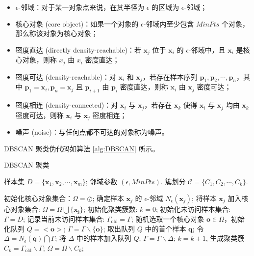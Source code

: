 \documentclass[12pt,AutoFakeBold]{article}
\begin{document}
\begin{itemize}
\item $\epsilon$-邻域：对于某一对象点来说，在其半径为 $\epsilon$ 的区域为 $\epsilon$-邻域；
\item 核心对象 (core object)：如果一个对象的 $\epsilon$-邻域内至少包含 $MinPts$ 个对象，那么称该对象为核心对象；
\item 密度直达 (directly density-reachable)：若 $\bm{x}_j$ 位于 $\bm{x}_i$ 的 $\epsilon$-邻域中，且 $\bm{x}_i$ 是核心对象，则称 $x_j$ 由 $x_i$ 密度直达；
\item 密度可达 (density-reachable)：对 $\bm{x}_i$ 和 $\bm{x}_j$，若存在样本序列 $\bm{p}_1,\bm{p}_2,\cdots,\bm{p}_n$，其中 $\bm{p}_1=\bm{x}_i,\bm{p}_n=\bm{x}_j$ 且 $\bm{p}_{i+1}$ 由 $\bm{p}_i$ 密度直达，则称 $\bm{x}_i$ 由 $\bm{x}_j$ 密度可达；
\item 密度相连 (density-connected)：对 $\bm{x}_i$ 与 $\bm{x}_j$，若存在 $\bm{x}_k$ 使得 $\bm{x}_i$ 与 $\bm{x}_j$ 均由 $\bm{x}_k$ 密度可达，则称 $\bm{x}_i$ 与 $\bm{x}_j$ 密度相连；
\item 噪声 (noise)：与任何点都不可达的对象称为噪声。
\end{itemize}

DBSCAN 聚类伪代码如算法 \ref{alg:DBSCAN} 所示。

\begin{algorithm}[H]
	\caption{DBSCAN 聚类}
	\label{alg:DBSCAN}
	\begin{algorithmic}[1]
	\Require 样本集 $D=\{\bm{x}_1,\bm{x}_2,\cdots,\bm{x}_m\}$; 邻域参数 $(\epsilon, MinPts)$.
	\Ensure 簇划分 $\mathcal{C} = \{C_1,C_2,\cdots,C_k\}$.
	
	\State 初始化核心对象集合：$\Omega=\oslash$;
		\State 确定样本 $\bm{x}_j$ 的 $\epsilon$-邻域 $N_\epsilon(\bm{x}_j)$;
			\State 将样本 $\bm{x}_j$ 加入核心对象集合: $\Omega=\Omega\bigcup\{\bm{x_j}\}$;
		\EndIf
	\EndFor
	\State 初始化聚类簇数: $k=0$;
	\State 初始化未访问样本集合: $\Gamma=D$;
	\While {$\Omega\neq\oslash$}
		\State 记录当前未访问样本集合: $\Gamma_{\mathrm{old}}=\Gamma$;
		\State 随机选取一个核心对象 $\bm{o}\in\Omega$，初始化队列 $Q=<\bm{o}>$;
		\State $\Gamma=\Gamma\backslash\{\bm{o}\}$;
			\State 取出队列 $Q$ 中的首个样本 $\bm{q}$;
				\State 令 $\Delta=N_\epsilon(\bm{q})\bigcap\Gamma$;
				\State 将 $\Delta$ 中的样本加入队列 $Q$;
				\State $\Gamma=\Gamma\backslash\Delta$;
			\EndIf
		\EndWhile
		\State $k=k+1$, 生成聚类簇 $C_k=\Gamma_{\mathrm{old}}\backslash\Gamma$;
		\State $\Omega=\Omega\backslash C_k$;
	\EndWhile
	\end{algorithmic} 
\end{algorithm}
\end{document}
